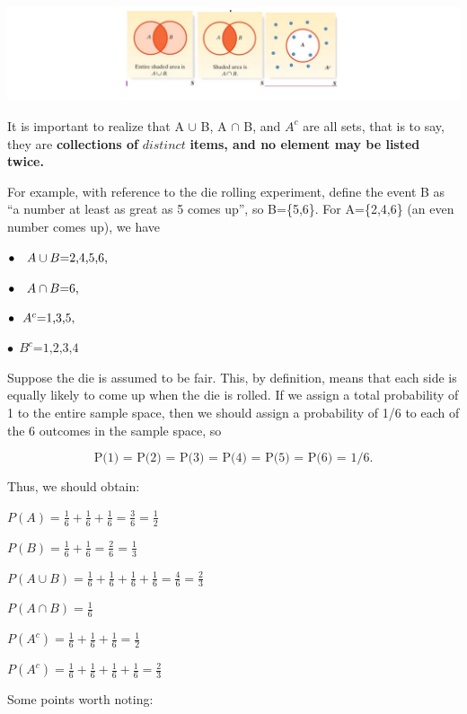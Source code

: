 \documentclass[
]{book}
\begin{document}
\includegraphics[width=7.5625in,height=\textheight]{images/img13.png}

It is important to realize that A \(\cup\) B, A \(\cap\) B, and \(A^c\) are all sets, that is to say, they are \textbf{collections of} \(\textit{distinct}\) \textbf{items, and no element may be listed twice.}

For example, with reference to the die rolling experiment, define the event B as ``a number at least as great as 5 comes up'', so B=\{5,6\}. For A=\{2,4,6\} (an even number comes up), we have

\(\bullet\ \  \ A \cup B \text{={2,4,5,6},}\\ \\\)

\(\bullet \ \ \ A\cap B \text{={6},}\\ \\\)

\(\bullet \ \ A^c \text{={1,3,5}}, \\\)

\(\bullet \ \ B^c \text{={1,2,3,4}}\)

Suppose the die is assumed to be fair. This, by definition, means that each side is equally likely to come up when the die is rolled. If we assign a total probability of 1 to the entire sample space, then we should assign a probability of 1/6 to each of the 6 outcomes in the sample space, so

\[
\text{P(1) = P(2) = P(3) = P(4) = P(5) = P(6) = 1/6.}
\]

Thus, we should obtain:

\(P(A) = \frac{1}{6}+\frac{1}{6}+\frac{1}{6}=\frac{3}{6}=\frac{1}{2}\)

\(P(B) = \frac{1}{6}+\frac{1}{6}=\frac{2}{6}=\frac{1}{3}\)

\(P(A \cup B) = \frac{1}{6}+\frac{1}{6}+\frac{1}{6}+\frac{1}{6}=\frac{4}{6}=\frac{2}{3}\)

\(P(A \cap B) = \frac{1}{6}\)

\(P(A^c) = \frac{1}{6}+\frac{1}{6}+\frac{1}{6}=\frac{1}{2}\)

\(P(A^c) = \frac{1}{6}+\frac{1}{6}+\frac{1}{6}+\frac{1}{6}=\frac{2}{3}\)

Some points worth noting:
\end{document}
